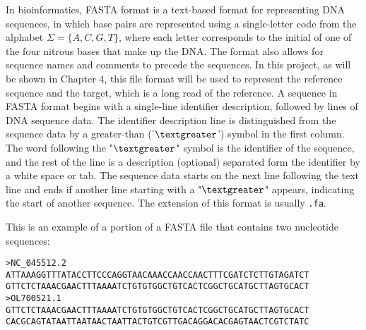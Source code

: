 In bioinformatics, FASTA format is a text-based format for representing DNA sequences, in which base pairs are represented using a single-letter code from the alphabet \(\Sigma = \{A, C, G, T\}\),  where each letter corresponds to the initial of one of the four nitrous bases that make up the DNA. The format also allows for sequence names and comments to precede the sequences. In this project, as will be shown in Chapter 4, this file format will be used to represent the reference sequence and the target, which is a long read of the reference. A sequence in FASTA format begins with a single-line identifier description, followed by lines of DNA sequence data. The identifier description line is distinguished from the sequence data by a greater-than ('\( \textgreater \)') symbol in the first column. The word following the "\( \textgreater \)" symbol is the identifier of the sequence, and the rest of the line is a description (optional) separated form the identifier by a white space or tab. The sequence data starts on the next line following the text line and ends if another line starting with a "\( \textgreater \)" appears, indicating the start of another sequence. The extension of this format is usually \texttt{.fa}. 

\begin{example}
  This is an example of a portion of a FASTA file that contains two nucleotide sequences:
\begin{verbatim}
>NC_045512.2 
ATTAAAGGTTTATACCTTCCCAGGTAACAAACCAACCAACTTTCGATCTCTTGTAGATCT
GTTCTCTAAACGAACTTTAAAATCTGTGTGGCTGTCACTCGGCTGCATGCTTAGTGCACT
>OL700521.1 
GTTCTCTAAACGAACTTTAAAATCTGTGTGGCTGTCACTCGGCTGCATGCTTAGTGCACT
CACGCAGTATAATTAATAACTAATTACTGTCGTTGACAGGACACGAGTAACTCGTCTATC
\end{verbatim}
\end{example}



